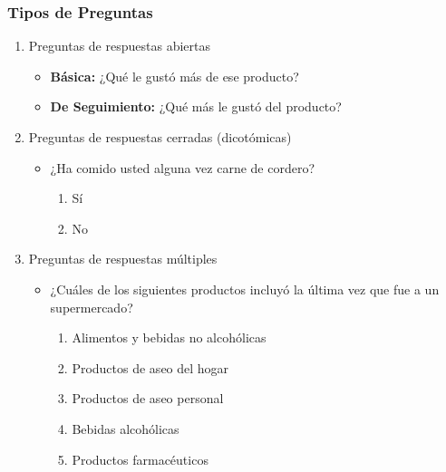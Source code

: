 \documentclass{article}
\begin{document}
        \subsubsection{Tipos de Preguntas}
            \begin{enumerate}[label=\arabic*.]
                \item Preguntas de respuestas abiertas
                    \begin{itemize}
                    \item \textbf{Básica:} ¿Qué le gustó más de ese producto?
                    \item \textbf{De Seguimiento:} ¿Qué más le gustó del producto?
                    \end{itemize}

                \item Preguntas de respuestas cerradas (dicotómicas)
                    \begin{itemize}
                        \item ¿Ha comido usted alguna vez carne de cordero?
                        \begin{multicols}{2}
                        \begin{enumerate}[label=\alph*.]
                        \item Sí
                        \item No
                        \end{enumerate}
                    \end{multicols}
                    \end{itemize}

                \item Preguntas de respuestas múltiples
                    \begin{itemize}
                        \item ¿Cuáles de los siguientes productos incluyó la última vez que fue a un supermercado?
                            \begin{enumerate}[label=\alph*.]
                            \item Alimentos y bebidas no alcohólicas
                            \item Productos de aseo del hogar
                            \item Productos de aseo personal
                            \item Bebidas alcohólicas
                            \item Productos farmacéuticos
                            \end{enumerate}
                    \end{itemize}


\end{enumerate}
\end{document}
